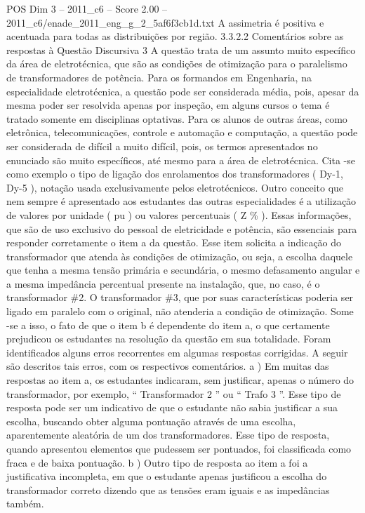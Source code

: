 \begin{textsample}{POS Dim 3 – 2011\_c6 – Score 2.00 – 2011\_c6/enade\_2011\_eng\_g\_2\_5af6f3cb1d.txt}
A assimetria é positiva e acentuada para todas as distribuições por região. 3.3.2.2 Comentários sobre as respostas à Questão Discursiva 3 A questão trata de um assunto muito específico da área de eletrotécnica, que são as condições de otimização para o paralelismo de transformadores de potência.
Para os formandos em Engenharia, na especialidade eletrotécnica, a questão pode ser considerada média, pois, apesar da mesma poder ser resolvida apenas por inspeção, em alguns cursos o tema é tratado somente em disciplinas optativas.
Para os alunos de outras áreas, como eletrônica, telecomunicações, controle e automação e computação, a questão pode ser considerada de difícil a muito difícil, pois, os termos apresentados no enunciado são muito específicos, até mesmo para a área de eletrotécnica.
Cita -se como exemplo o tipo de ligação dos enrolamentos dos transformadores ( Dy-1, Dy-5 ), notação usada exclusivamente pelos eletrotécnicos.
Outro conceito que nem sempre é apresentado aos estudantes das outras especialidades é a utilização de valores por unidade ( pu ) ou valores percentuais ( Z \% ).
Essas informações, que são de uso exclusivo do pessoal de eletricidade e potência, são essenciais para responder corretamente o item a da questão.
Esse item solicita a indicação do transformador que atenda às condições de otimização, ou seja, a escolha daquele que tenha a mesma tensão primária e secundária, o mesmo defasamento angular e a mesma impedância percentual presente na instalação, que, no caso, é o transformador \#2.
O transformador \#3, que por suas características poderia ser ligado em paralelo com o original, não atenderia a condição de otimização.
Some -se a isso, o fato de que o item b é dependente do item a, o que certamente prejudicou os estudantes na resolução da questão em sua totalidade.
Foram identificados alguns erros recorrentes em algumas respostas corrigidas.
A seguir são descritos tais erros, com os respectivos comentários. a ) Em muitas das respostas ao item a, os estudantes indicaram, sem justificar, apenas o número do transformador, por exemplo, “ Transformador 2 ” ou “ Trafo 3 ”.
Esse tipo de resposta pode ser um indicativo de que o estudante não sabia justificar a sua escolha, buscando obter alguma pontuação através de uma escolha, aparentemente aleatória de um dos transformadores.
Esse tipo de resposta, quando apresentou elementos que pudessem ser pontuados, foi classificada como fraca e de baixa pontuação. b ) Outro tipo de resposta ao item a foi a justificativa incompleta, em que o estudante apenas justificou a escolha do transformador correto dizendo que as tensões eram iguais e as impedâncias também.

\end{textsample}
